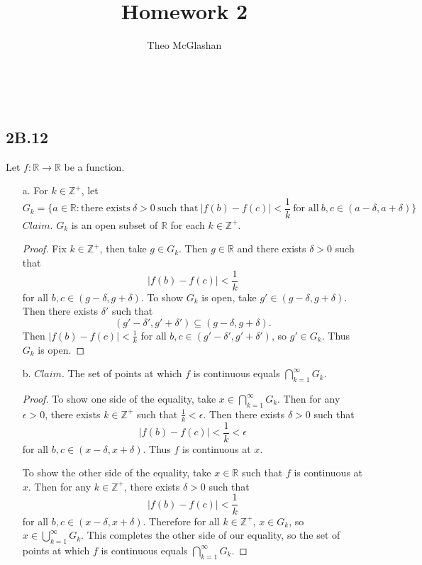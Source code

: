 \documentclass[12pt]{article}
\title{Homework 2}
\author{Theo McGlashan}
\date{}
\begin{document}
\maketitle
\newpage
\
\newpage

\subsection*{2B.12}

Let $f : \mathbb{R} \to \mathbb{R}$ be a function.

\begin{itemize}
    \item[a.] For $k \in \mathbb{Z}^+$, let $$G_k = \{ a \in \mathbb{R} : \text{there exists}~ \delta > 0 ~\text{such that}~ |f(b) - f(c)| < \frac{1}{k} ~\text{for all}~ b,c \in (a - \delta, a + \delta)\}$$
    $Claim.$ $G_k$ is an open subset of $\mathbb{R}$ for each $k \in \mathbb{Z}^+$.

    \begin{proof}
        Fix $k \in \mathbb{Z}^+$, then take $g \in G_k$. Then $g \in \mathbb{R}$ and there exists $\delta > 0$ such that $$|f(b) - f(c)| < \frac{1}{k}$$ for all $b,c \in (g - \delta, g + \delta)$. To show $G_k$ is open, take $g' \in (g - \delta, g + \delta)$. Then there exists $\delta'$ such that $$(g' - \delta', g' + \delta') \subseteq (g - \delta, g + \delta).$$ Then $|f(b) - f(c)| < \frac{1}{k}$ for all $b,c \in (g' - \delta', g' + \delta')$, so $g' \in G_k$. Thus $G_k$ is open.
    \end{proof}

    \item[b.] $Claim.$ The set of points at which $f$ is continuous equals $\bigcap_{k=1}^\infty G_k$.
    
    \begin{proof}
        To show one side of the equality, take $x \in \bigcap_{k=1}^\infty G_k$. Then for any $\epsilon > 0$, there exists $k \in \mathbb{Z}^+$ such that $\frac{1}{k} < \epsilon$. Then there exists $\delta > 0$ such that $$|f(b) - f(c)| < \frac{1}{k} < \epsilon$$ for all $b,c \in (x - \delta, x + \delta)$. Thus $f$ is continuous at $x$.

        To show the other side of the equality, take $x \in \mathbb{R}$ such that $f$ is continuous at $x$. Then for any $k \in \mathbb{Z}^+$, there exists $\delta > 0$ such that $$|f(b) - f(c)| < \frac{1}{k}$$ for all $b, c \in (x - \delta, x + \delta)$. Therefore for all $k \in \mathbb{Z}^+$, $x \in G_k$, so $x \in \bigcup_{k=1}^\infty G_k$. This completes the other side of our equality, so the set of points at which $f$ is continuous equals $\bigcap_{k=1}^\infty G_k$.
    \end{proof}


\end{itemize}
\end{document}

